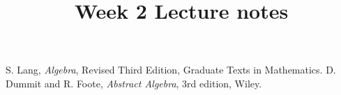 \documentclass[a4paper, reqno, 12pt]{amsart}
\theoremstyle{definition}
\numberwithin{equation}{section}
\numberwithin{thm}{section}
\begin{document}
\title[]{Week 2 Lecture notes }

\maketitle

\begin{thebibliography}{}
    S. Lang, {\em Algebra}, Revised Third Edition, Graduate Texts in Mathematics.
    D. Dummit and R. Foote, {\em Abstract Algebra}, 3rd edition, Wiley.
\end{thebibliography}
\end{document}
